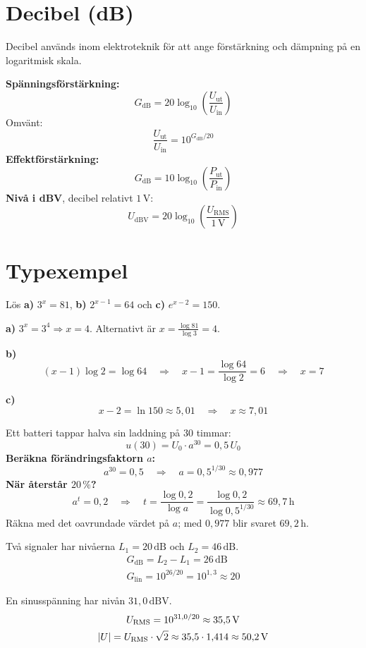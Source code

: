 \section{Decibel (dB)}
\label{c10:sec:decibel}
Decibel används inom elektroteknik för att ange förstärkning och dämpning på en logaritmisk skala.

\textbf{Spänningsförstärkning:}
\[
  G_{\text{dB}} = 20 \log_{10}\left(\frac{U_{\text{ut}}}{U_{\text{in}}}\right)
\]
Omvänt:
\[
  \frac{U_{\text{ut}}}{U_{\text{in}}} = 10^{G_{\text{dB}}/20}
\]
\textbf{Effektförstärkning:}
\[
  G_{\text{dB}} = 10 \log_{10}\left(\frac{P_{\text{ut}}}{P_{\text{in}}}\right)
\]
\textbf{Nivå i dBV}, decibel relativt $1\,\text{V}$:
\[
  U_{\text{dBV}} = 20 \log_{10}\left(\frac{U_{\text{RMS}}}{1\,\text{V}}\right)
\]

\section{Typexempel}
\label{c10:sec:typexempel}

\begin{exempel}
Lös \textbf{a)} $3^x = 81$, \textbf{b)} $2^{x-1} = 64$ och \textbf{c)} $e^{x-2} = 150$.

\textbf{a)} $3^x = 3^4 \Rightarrow x = 4$. Alternativt är $x = \frac{\log 81}{\log 3} = 4$.

\textbf{b)}
\[
  (x-1)\log 2 = \log 64 \quad \Rightarrow \quad x - 1 = \frac{\log 64}{\log 2} = 6
  \quad \Rightarrow \quad x = 7
\]

\textbf{c)}
\[
  x - 2 = \ln 150 \approx 5{,}01 \quad \Rightarrow \quad x \approx 7{,}01
\]
\end{exempel}

\begin{exempel}
Ett batteri tappar halva sin laddning på $30$ timmar:
\[
  u(30) = U_0 \cdot a^{30} = 0{,}5\,U_0
\]
\textbf{Beräkna förändringsfaktorn $a$:}
\[
  a^{30} = 0{,}5 \quad \Rightarrow \quad a = 0{,}5^{1/30} \approx 0{,}977
\]
\textbf{När återstår $20\,\%$?}
\[
  a^t = 0{,}2 \quad \Rightarrow \quad t = \frac{\log 0{,}2}{\log a}
  = \frac{\log 0{,}2}{\log 0{,}5^{1/30}} \approx 69{,}7\,\text{h}
\]
Räkna med det oavrundade värdet på $a$; med $0{,}977$ blir svaret $69{,}2\,\text{h}$.
\end{exempel}

\begin{exempel}
Två signaler har nivåerna $L_1 = 20\,\text{dB}$ och $L_2 = 46\,\text{dB}$.
\begin{gather*}
  G_{\text{dB}} = L_2 - L_1 = 26\,\text{dB} \\
  G_{\text{lin}} = 10^{26/20} = 10^{1{,}3} \approx 20
\end{gather*}
\end{exempel}

\begin{exempel}
En sinusspänning har nivån $31{,}0\,\text{dBV}$.
\begin{gather*}
  U_{\text{RMS}} = 10^{31{,}0/20} \approx 35{,}5\,\text{V} \\
  \lvert U\rvert = U_{\text{RMS}} \cdot \sqrt{2} \approx 35{,}5 \cdot 1{,}414 \approx 50{,}2\,\text{V}
\end{gather*}
\end{exempel}
